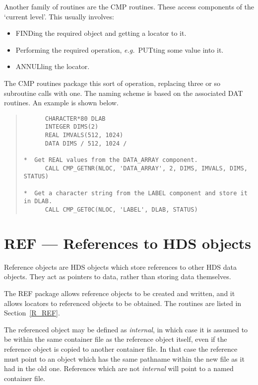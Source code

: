 Another family of routines are the CMP routines.
These access components of the `current level'.
This usually involves: 

\begin{itemize}

\item FINDing the required object and getting a locator to it.

\item Performing the required operation, {\em e.g.}\ PUTting some value into it.

\item ANNULling the locator.

\end{itemize}

The CMP routines package this sort of operation, replacing three or so
subroutine calls with one.
The naming scheme is based on the associated DAT routines.
An example is shown below. 

\begin{quote}

\begin{small}
\begin{verbatim}
      CHARACTER*80 DLAB
      INTEGER DIMS(2)
      REAL IMVALS(512, 1024)
      DATA DIMS / 512, 1024 /

*  Get REAL values from the DATA_ARRAY component.
      CALL CMP_GETNR(NLOC, 'DATA_ARRAY', 2, DIMS, IMVALS, DIMS, STATUS)

*  Get a character string from the LABEL component and store it in DLAB.
      CALL CMP_GET0C(NLOC, 'LABEL', DLAB, STATUS)
\end{verbatim}
\end{small}

\end{quote}

\section{REF --- References to HDS objects}
\label{S_ref}

Reference objects are HDS objects which store references to other HDS data
objects.
They act as pointers to data, rather than storing data themselves.

The REF package allows reference objects to be created and written, and it
allows locators to referenced objects to be obtained.
The routines are listed in Section~\ref{R_REF}.

The referenced object may be defined as {\em internal\/}, in which case it is
assumed to be within the same container file as the reference object itself,
even if the reference object is copied to another container file.
In that case the reference must point to an object which has the same pathname
within the new file as it had in the old one.
References which are not {\em internal\/} will point to a named container file.

